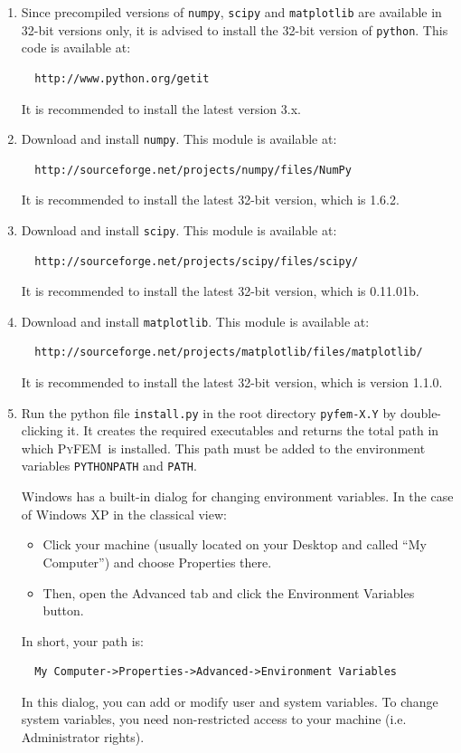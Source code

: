 \documentclass{article}
\newcommand{\progname}{\textsc{PyFEM}}
\begin{document}
\begin{enumerate}
\item Since precompiled versions of \texttt{numpy}, \texttt{scipy} and 
\texttt{matplotlib} are available in 32-bit versions only, it
is advised to install the 32-bit version of \texttt{python}. This code is available
at:
\begin{verbatim}
  http://www.python.org/getit
\end{verbatim} 
It is recommended to install the latest version 3.x.
\item Download and install \texttt{numpy}.
This module is available at:
\begin{verbatim}
  http://sourceforge.net/projects/numpy/files/NumPy
\end{verbatim}
It is recommended to install the latest 32-bit version, which is 1.6.2.
\item Download and install \texttt{scipy}.
This module is available at:
\begin{verbatim}
  http://sourceforge.net/projects/scipy/files/scipy/
\end{verbatim}
It is recommended to install the latest 32-bit version, which is 0.11.01b.
\item Download and install \texttt{matplotlib}.
This module is available at:
\begin{verbatim}
  http://sourceforge.net/projects/matplotlib/files/matplotlib/
\end{verbatim}
It is recommended to install the latest 32-bit version, which is version 1.1.0.
\item Run the python file \texttt{install.py} in the root directory 
\texttt{pyfem-X.Y} by double-clicking it. It creates the required executables 
and returns the total path in which \progname~is installed. This path must be 
added to the environment variables \texttt{PYTHONPATH} and \texttt{PATH}. 

Windows has a built-in dialog for changing environment variables. In the case of Windows XP in
the classical view:
\begin{itemize} 
\item Click your machine (usually located on your Desktop 
and called “My Computer”) and choose Properties there. 
\item Then, open the Advanced tab and click the Environment 
Variables button.
\end{itemize} In short, your path is:
\begin{verbatim}
  My Computer->Properties->Advanced->Environment Variables
\end{verbatim}
In this dialog, you can add or modify user and system variables. 
To change system variables, you need non-restricted access to your machine (i.e. Administrator rights).


\end{enumerate}
\end{document}

